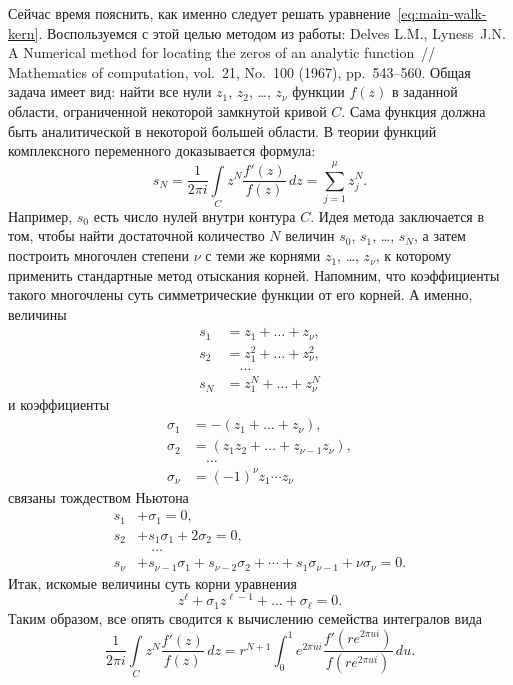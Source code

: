 \documentclass[10pt,oneside,final]{book}
\begin{document}
Сейчас время пояснить, как именно следует решать
уравнение~\eqref{eq:main-walk-kern}. Воспользуемся с этой целью методом из
работы: \foreignlanguage{english}{Delves L.M., Lyness~J.N. A Numerical method
  for locating the zeros of an analytic function~// Mathematics of computation,
  vol.~21, No.~100 (1967), pp.~543--560.}  Общая задача имеет вид: найти все
нули $z_1$, $z_2$, \ldots, $z_\nu$ функции $f(z)$ в заданной области,
ограниченной некоторой замкнутой кривой $C$. Сама функция должна быть
аналитической в некоторой большей области. В теории функций комплексного
переменного доказывается формула:
\[
s_N=\dfrac{1}{2\pi i} \int\limits_{C} z^N\dfrac{f'(z)}{f(z)}\,dz =
\sum_{j=1}^\mu z_j^N.
\]
Например, $s_0$ есть число нулей внутри контура $C$.  Идея метода заключается в
том, чтобы найти достаточной количество $N$ величин $s_0$, $s_1$, \ldots, $s_N$,
а затем построить многочлен степени $\nu$ с теми же корнями $z_1$, \ldots,
$z_\nu$,  к которому применить стандартные метод отыскания корней. Напомним, что
коэффициенты такого многочлены суть симметрические функции от его корней. А
именно, величины
\begin{align*}
  s_1 & = z_1+\ldots + z_\nu,\\
  s_2 & = z^2_1+\ldots + z^2_\nu,\\
   & \quad \ldots\\
  s_N & = z^N_1+\ldots + z_\nu^N
\end{align*}
и коэффициенты
\begin{align*}
  \sigma_1 & = -(z_1+\ldots+z_\nu),\\
  \sigma_2 & = (z_1z_2+\ldots+z_{\nu-1}z_\nu),\\
  & \quad \ldots\\
  \sigma_\nu & = (-1)^\nu z_1\cdots z_\nu
\end{align*}
связаны тождеством Ньютона
\begin{align*}
  s_1 &+ \sigma_1 = 0,\\
  s_2 &+ s_1\sigma_1 + 2\sigma_2 = 0,\\
  &\quad\ldots\\
  s_\nu &+ s_{\nu-1} \sigma_1+ s_{\nu-2}\sigma_2+\cdots+s_1 \sigma_{\nu-1} + \nu
  \sigma_\nu =0.
\end{align*}
Итак, искомые величины суть корни уравнения
\[
z^\ell+\sigma_1z^{\ell-1}+\ldots+\sigma_\ell=0.
\]
Таким образом, все опять сводится к вычислению семейства интегралов вида
\[
\dfrac{1}{2\pi i} \int\limits_{C} z^N\dfrac{f'(z)}{f(z)}\,dz=
r^{N+1}
\int_0^1 e^{2\pi u i}\dfrac{f'(re^{2\pi u i})}{f(re^{2\pi u i})}\,du.
\]
\end{document}
